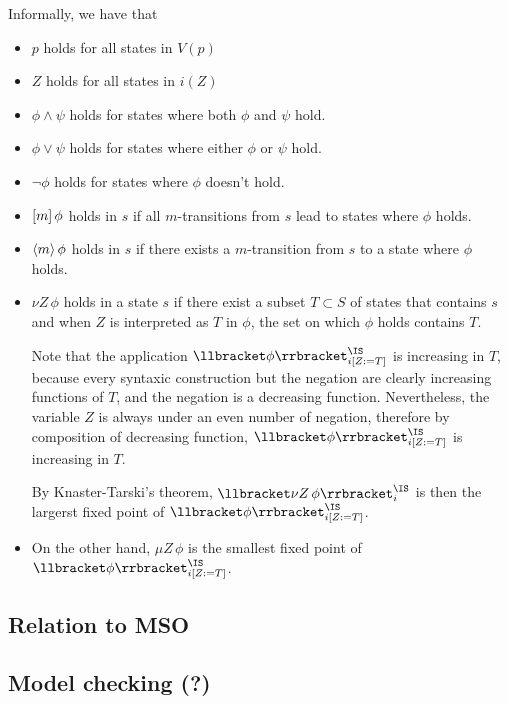 Informally, we have that
\begin{itemize}
    \item $p$ holds for all states in $V(p)$
    \item $Z$ holds for all states in $i(Z)$
    \item $\phi \wedge \psi$ holds for states where both $\phi$ and $\psi$ hold.
    \item $\phi \vee \psi$ holds for states where either $\phi$ or $\psi$ hold.
    \item $\neg \phi$ holds for states where $\phi$ doesn't hold.
    \item $[m]\, \phi$ holds in $s$ if all $m$-transitions from $s$ lead to states where $\phi$ holds.
    \item $\langle m\rangle\, \phi$ holds in $s$ if there exists a $m$-transition from $s$ to a state where $\phi$ holds.
    \item $\nu Z \, \phi$ holds in a state $s$
        if there exist a subset $T \subset S$ of states
        that contains $s$ and when $Z$ is interpreted as $T$
        in $\phi$, the set on which $\phi$ holds contains $T$.

        Note that the application
        $\Meaning{\phi}^\IS_{i[Z := T]}$ is increasing in $T$,
        because every syntaxic construction but the negation are clearly
        increasing functions of $T$, and the negation is a decreasing
        function. Nevertheless, the variable $Z$ is always under an even number of
        negation, therefore by composition of decreasing function,
        $\Meaning{\phi}^\IS_{i[Z := T]}$ is increasing in $T$.

        By Knaster-Tarski's theorem, $\Meaning{\nu Z\, \phi}^\IS_i$
        is then the largerst fixed point of $\Meaning{\phi}^\IS_{i[Z := T]}$.
    \item On the other hand, $\mu Z \, \phi$ is the smallest fixed point
        of $\Meaning{\phi}^\IS_{i[Z := T]}$.
\end{itemize}

\subsection{Relation to MSO}
\subsection{Model checking (?)}
























